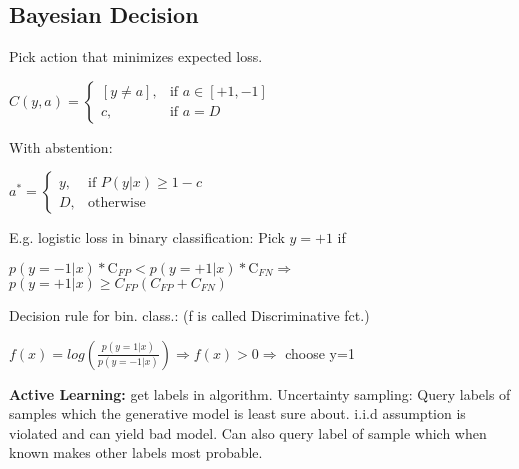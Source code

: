 \subsection{Bayesian Decision}

Pick action that minimizes expected loss.

\begin{center}
    $C(y,a) = \begin{cases}
        [y \neq a], & \text{if } a \in [+1,-1]\\
        c, & \text{if } a = D
    \end{cases}$
\end{center}

With abstention:
\begin{center}
    $a^* = \begin{cases}
        y, & \text{if } P(y|x) \geq 1-c\\
        D, & \text{otherwise} 
    \end{cases}$
\end{center}

E.g. logistic loss in binary classification: Pick $y = +1$ if
\begin{center}
    $p(y=-1|x) * \text{C}_{FP} < p(y=+1|x)*\text{C}_{FN} \Rightarrow$\\$ p(y=+1|x)\geq C_{FP}(C_{FP} + C_{FN})$
\end{center}

Decision rule for bin. class.: (f is called Discriminative fct.)

$f(x) = log(\frac{p(y=1|x)}{p(y=-1|x)}) \Rightarrow f(x)>0 \Rightarrow $ choose y=1

\textbf{Active Learning:} get labels in algorithm. Uncertainty sampling: Query labels of samples which the generative model is least sure about. i.i.d assumption is violated and can yield bad model. Can also query label of sample which when known makes other labels most probable.


